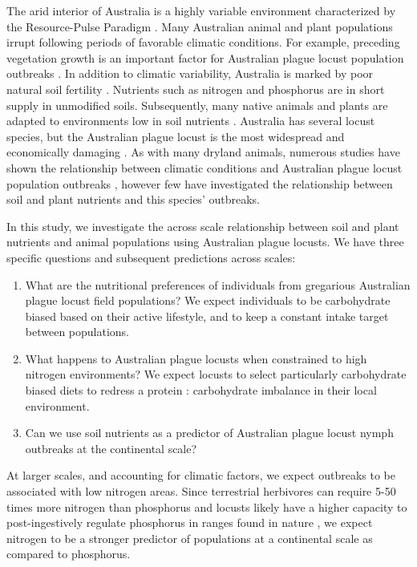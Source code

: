 \documentclass[
]{article}
\begin{document}
The arid interior of Australia is a highly variable environment
\citep{morton_fresh_2011} characterized by the Resource-Pulse Paradigm
\citep{noy-meir_desert_1974, whitford_ecology_2002}. Many Australian
animal and plant populations irrupt following periods of favorable
climatic conditions. For example, preceding vegetation growth is an
important factor for Australian plague locust population outbreaks
\citep{lawton_seeing_2022}. In addition to climatic variability,
Australia is marked by poor natural soil fertility
\citep{morton_fresh_2011, orians_ecology_2007}. Nutrients such as
nitrogen and phosphorus are in short supply in unmodified soils.
Subsequently, many native animals and plants are adapted to environments
low in soil nutrients \citep{orians_ecology_2007}. Australia has several
locust species, but the Australian plague locust is the most widespread
and economically damaging \citep{hunter_adaptations_2001}. As with many
dryland animals, numerous studies have shown the relationship between
climatic conditions and Australian plague locust population outbreaks
\citep{clark_influence_1974, deveson_not_2005, farrow_population_1982, key_general_1945},
however few have investigated the relationship between soil and plant
nutrients and this species' outbreaks.

In this study, we investigate the across scale relationship between soil
and plant nutrients and animal populations using Australian plague
locusts. We have three specific questions and subsequent predictions
across scales:

\begin{enumerate}
\def\labelenumi{\arabic{enumi})}
\item
  What are the nutritional preferences of individuals from gregarious
  Australian plague locust field populations? We expect individuals to
  be carbohydrate biased based on their active lifestyle, and to keep a
  constant intake target between populations.
\item
  What happens to Australian plague locusts when constrained to high
  nitrogen environments? We expect locusts to select particularly
  carbohydrate biased diets to redress a protein : carbohydrate
  imbalance in their local environment.
\item
  Can we use soil nutrients as a predictor of Australian plague locust
  nymph outbreaks at the continental scale?
\end{enumerate}

At larger scales, and accounting for climatic factors, we expect
outbreaks to be associated with low nitrogen areas. Since terrestrial
herbivores can require 5-50 times more nitrogen than phosphorus
\citep{elser_nutritional_2000} and locusts likely have a higher capacity
to post-ingestively regulate phosphorus in ranges found in nature
\citep{cease_dietary_2016, zhang_grasshoppers_2014}, we expect nitrogen
to be a stronger predictor of populations at a continental scale as
compared to phosphorus.
\end{document}
